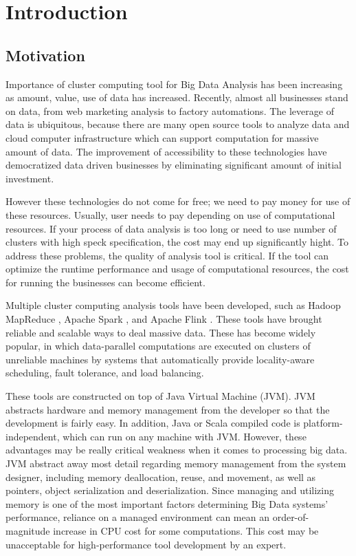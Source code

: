 \chapter{Introduction}
\label{chapter:Introduction}
\thispagestyle{myheadings}


\section{Motivation}
\label{sec:motivation}
Importance of cluster computing tool for Big Data Analysis has been increasing as amount, value, use of data has increased. 
Recently, almost all businesses stand on data, from web marketing analysis to factory automations. The leverage of data is ubiquitous, because 
there are many open source tools to analyze data and cloud computer infrastructure which can support computation for massive amount of data. 
The improvement of accessibility to these technologies have democratized data driven businesses by 
eliminating significant amount of initial investment. 

However these technologies do not come for free; we need to pay money for use of these resources. Usually, user needs to pay depending on use of computational resources. 
If your process of data analysis is too long or need to use number of clusters with high speck specification, the cost may end up significantly hight.
To address these problems, the quality of analysis tool is critical. If the tool can optimize the runtime performance and usage of computational resources, 
the cost for running the businesses can become efficient.

Multiple cluster computing analysis tools have been developed, such as Hadoop MapReduce \cite{ApacheHadoopHomePage}, 
Apache Spark \cite{ApacheSparkHomePage}, and Apache Flink \cite{ApacheFlinkHomePage}. 
These tools have brought reliable and scalable ways to deal massive data. 
These has become widely popular, in which data-parallel computations are executed on clusters of unreliable machines by systems that automatically provide locality-aware scheduling, 
fault tolerance, and load balancing. 

These tools are constructed on top of Java Virtual Machine (JVM). JVM abstracts hardware and memory management from the developer so that the development is fairly easy. 
In addition, Java or Scala compiled code is platform-independent, which can run on any machine with JVM. However, these advantages may be really critical weakness when it comes to 
processing big data. JVM abstract away most detail regarding memory management from the system designer, including memory deallocation, reuse, and movement, as well as pointers, 
object serialization and deserialization. Since managing and utilizing memory is one of the most important factors determining Big Data systems' performance, 
reliance on a managed environment can mean an order-of-magnitude increase in CPU cost for some computations. This cost may be unacceptable for high-performance tool development by an expert.

